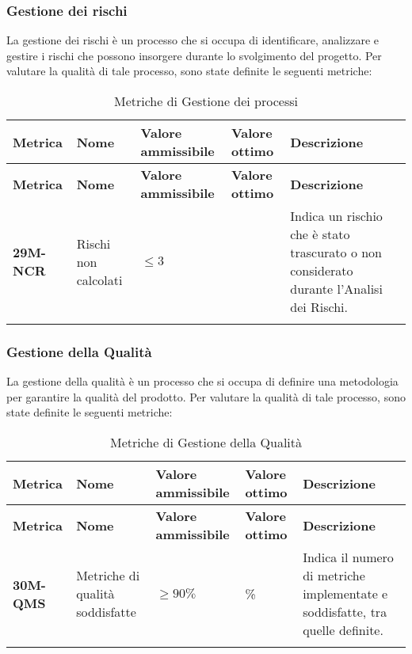 \subsubsection{Gestione dei rischi}
La gestione dei rischi è un processo che si occupa di identificare, analizzare e gestire i rischi che possono
insorgere durante lo svolgimento del progetto. Per valutare la qualità di tale processo, sono state definite le seguenti metriche:
\begin{longtable}{|>{\raggedright\arraybackslash}m{}|>{\raggedright\arraybackslash}m{}|>{\raggedright\arraybackslash}m{}|>{\raggedright\arraybackslash}m{}|>{\raggedright\arraybackslash}m{}|}
	\hline
	\textbf{Metrica} & \textbf{Nome} & \textbf{Valore ammissibile} & \textbf{Valore ottimo} & \textbf{Descrizione}\\
	\hline
	\endfirsthead
	\hline
	\textbf{Metrica} & \textbf{Nome} & \textbf{Valore ammissibile} & \textbf{Valore ottimo} & \textbf{Descrizione}\\
	\endhead
	\textbf{29M-NCR} & Rischi non calcolati & $\leq 3 $ & 0 & Indica un rischio che è stato trascurato o non considerato durante l’Analisi dei Rischi. \\
	\hline
	\hline
	\caption{Metriche di Gestione dei processi}
	\label{table:9}
\end{longtable}

\subsubsection{Gestione della Qualità}
La gestione della qualità è un processo che si occupa di definire una metodologia per garantire la qualità del prodotto.
Per valutare la qualità di tale processo, sono state definite le seguenti metriche:
\begin{longtable}{|>{\raggedright\arraybackslash}m{}|>{\raggedright\arraybackslash}m{}|>{\raggedright\arraybackslash}m{}|>{\raggedright\arraybackslash}m{}|>{\raggedright\arraybackslash}m{}|}
	\hline
	\textbf{Metrica} & \textbf{Nome} & \textbf{Valore ammissibile} & \textbf{Valore ottimo} & \textbf{Descrizione} \\
	\hline
	\endfirsthead
	\hline
	\textbf{Metrica} & \textbf{Nome} & \textbf{Valore ammissibile} & \textbf{Valore ottimo} & \textbf{Descrizione}\\
	\endhead
	\textbf{30M-QMS} & Metriche di qualità soddisfatte & $\geq 90\% $ & 100\% & Indica il numero di metriche implementate e soddisfatte, tra quelle definite. \\
	\hline
	\caption{Metriche di Gestione della Qualità}
	\label{table:10}
\end{longtable}

